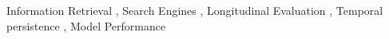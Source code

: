 \documentclass{ceurart}
\begin{document}
\begin{keywords}
  Information Retrieval \sep
  Search Engines \sep
  Longitudinal Evaluation \sep
  Temporal persistence \sep
  Model Performance
\end{keywords}

\maketitle




%


















\end{document}
